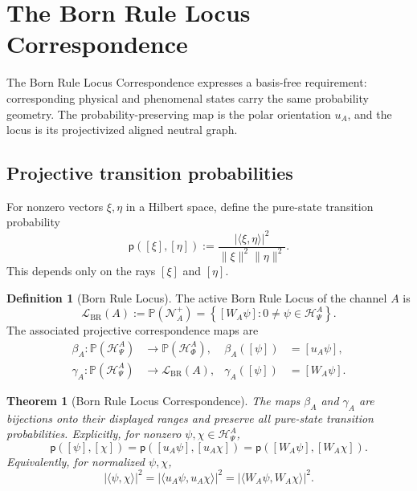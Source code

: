 \documentclass[11pt,reqno]{scrartcl}
\newcommand{\polA}{u_A}
\newcommand{\inner}[2]{\langle #1,#2\rangle}
\newcommand{\projective}[1]{\mathbb P\!\left(#1\right)}
\newcommand{\actHP}{\mathscr H_{\Psi}^{A}}
\newcommand{\actHF}{\mathscr H_{\Phi}^{A}}
\newcommand{\NAplus}{\mathscr N_{A}^{+}}
\newcommand{\WA}{W_{A}}
\newcommand{\LBR}{\mathscr L_{\mathrm{BR}}(A)}
\newcommand{\BRprob}{\mathsf p}
\theoremstyle{plain}
\newtheorem{theorem}{Theorem}[section]
\theoremstyle{definition}
\newtheorem{definition}[definition]{Definition}
\theoremstyle{remark}
\begin{document}
\section{The Born Rule Locus Correspondence}
\label{sec:born-rule-locus-correspondence}

The Born Rule Locus Correspondence expresses a basis-free requirement:
corresponding physical and phenomenal states carry the same probability
geometry.  The probability-preserving map is the polar orientation
\(\polA\), and the locus is its projectivized aligned neutral graph.

\subsection{Projective transition probabilities}

For nonzero vectors \(\xi,\eta\) in a Hilbert space, define the pure-state
transition probability
\begin{equation}
  \BRprob([\xi],[\eta])
  :=\frac{|\inner{\xi}{\eta}|^2}
          {\|\xi\|^2\|\eta\|^2}.
  \label{eq:projective-transition-probability}
\end{equation}
This depends only on the rays \([\xi]\) and \([\eta]\).

\begin{definition}[Born Rule Locus]
\label{def:born-rule-locus}
The active Born Rule Locus of the channel \(A\) is
\begin{equation}
  \boxed{
  \LBR:=\projective{\NAplus}
  =\left\{
      [\WA\psi]:0\neq\psi\in\actHP
    \right\}.}
  \label{eq:BR-locus-definition}
\end{equation}
The associated projective correspondence maps are
\begin{align}
  \beta_A:
  \projective{\actHP}&\longrightarrow\projective{\actHF},
  &\beta_A([\psi])&=[\polA\psi],
  \label{eq:betaA-projective-map}\\
  \gamma_A:
  \projective{\actHP}&\longrightarrow\LBR,
  &\gamma_A([\psi])&=[\WA\psi].
  \label{eq:gammaA-projective-map}
\end{align}
\end{definition}

\begin{theorem}[Born Rule Locus Correspondence]
\label{thm:BRLC}
The maps \(\beta_A\) and \(\gamma_A\) are bijections onto their displayed
ranges and preserve all pure-state transition probabilities.  Explicitly,
for nonzero \(\psi,\chi\in\actHP\),
\begin{equation}
  \boxed{
  \BRprob([\psi],[\chi])
  =\BRprob([\polA\psi],[\polA\chi])
  =\BRprob([\WA\psi],[\WA\chi]).}
  \label{eq:BRLC-transition-probability}
\end{equation}
Equivalently, for normalized \(\psi,\chi\),
\begin{equation}
  |\inner{\psi}{\chi}|^2
  =|\inner{\polA\psi}{\polA\chi}|^2
  =|\inner{\WA\psi}{\WA\chi}|^2.
  \label{eq:BRLC-normalized-form}
\end{equation}
\end{theorem}
\end{document}
